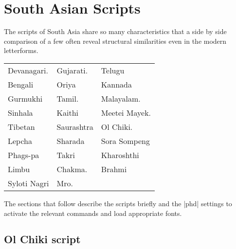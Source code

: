 
\arial


\chapter{South Asian Scripts}

The scripts of South Asia share so many characteristics that a side by side comparison of a few often reveal structural similarities even in the 
modern letterforms.
\medskip


\begin{center}
\begin{tabular}{lll}
Devanagari. &Gujarati. &Telugu\\
Bengali   &Oriya &Kannada\\
Gurmukhi &Tamil.  &Malayalam.\\
Sinhala &Kaithi  &Meetei Mayek.\\
Tibetan &Saurashtra &Ol Chiki.\\
Lepcha  &Sharada &Sora Sompeng\\
Phags-pa &Takri &Kharoshthi\\
Limbu &Chakma. & Brahmi\\
Syloti Nagri &Mro. &\\
\end{tabular}
\end{center}

The sections that follow describe the scripts briefly and the |phd| settings
to activate the relevant commands and load appropriate fonts. 





















\section{Ol Chiki script}
\arial

